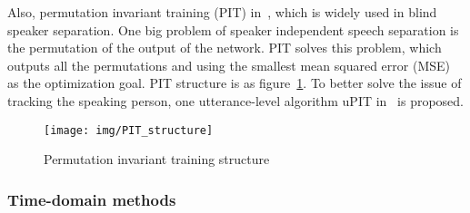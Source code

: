 Also, permutation invariant training (PIT) in~\cite{PIT}, which is widely used in blind speaker separation.
One big problem of speaker independent speech separation is the permutation of the output of the network.
PIT solves this problem, which outputs all the permutations and using the smallest mean squared error (MSE) as the optimization goal.
PIT structure is as figure~\ref{fig:PIT_structure}.
To better solve the issue of tracking the speaking person, one utterance-level algorithm uPIT in~\cite{uPIT} is proposed.
\begin{figure}[!htbp]
    \centering
    \texttt{[image: img/PIT\_structure]}
    \caption{Permutation invariant training structure}
    \label{fig:PIT_structure}
\end{figure}

\subsubsection{Time-domain methods}
